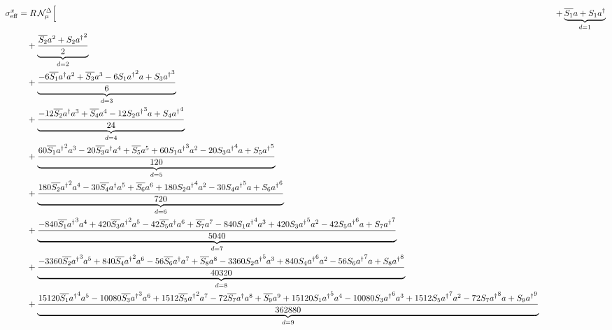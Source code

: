\begin{align}
\sigma^{x}_{\rm eff} &= R\,\mathcal N^{\Delta}_{\mu}\Bigl[
  &\quad + \underbrace{\overline{{S}_{1}} {a} + {S}_{1} {{a}^\dagger}}_{d=1} \\
  &\quad + \underbrace{\frac{\overline{{S}_{2}} {a}^{2} + {S}_{2} {{a}^\dagger}^{2}}{2}}_{d=2} \\
  &\quad + \underbrace{\frac{- 6 \overline{{S}_{1}} {{a}^\dagger} {a}^{2} + \overline{{S}_{3}} {a}^{3} - 6 {S}_{1} {{a}^\dagger}^{2} {a} + {S}_{3} {{a}^\dagger}^{3}}{6}}_{d=3} \\
  &\quad + \underbrace{\frac{- 12 \overline{{S}_{2}} {{a}^\dagger} {a}^{3} + \overline{{S}_{4}} {a}^{4} - 12 {S}_{2} {{a}^\dagger}^{3} {a} + {S}_{4} {{a}^\dagger}^{4}}{24}}_{d=4} \\
  &\quad + \underbrace{\frac{60 \overline{{S}_{1}} {{a}^\dagger}^{2} {a}^{3} - 20 \overline{{S}_{3}} {{a}^\dagger} {a}^{4} + \overline{{S}_{5}} {a}^{5} + 60 {S}_{1} {{a}^\dagger}^{3} {a}^{2} - 20 {S}_{3} {{a}^\dagger}^{4} {a} + {S}_{5} {{a}^\dagger}^{5}}{120}}_{d=5} \\
  &\quad + \underbrace{\frac{180 \overline{{S}_{2}} {{a}^\dagger}^{2} {a}^{4} - 30 \overline{{S}_{4}} {{a}^\dagger} {a}^{5} + \overline{{S}_{6}} {a}^{6} + 180 {S}_{2} {{a}^\dagger}^{4} {a}^{2} - 30 {S}_{4} {{a}^\dagger}^{5} {a} + {S}_{6} {{a}^\dagger}^{6}}{720}}_{d=6} \\
  &\quad + \underbrace{\frac{- 840 \overline{{S}_{1}} {{a}^\dagger}^{3} {a}^{4} + 420 \overline{{S}_{3}} {{a}^\dagger}^{2} {a}^{5} - 42 \overline{{S}_{5}} {{a}^\dagger} {a}^{6} + \overline{{S}_{7}} {a}^{7} - 840 {S}_{1} {{a}^\dagger}^{4} {a}^{3} + 420 {S}_{3} {{a}^\dagger}^{5} {a}^{2} - 42 {S}_{5} {{a}^\dagger}^{6} {a} + {S}_{7} {{a}^\dagger}^{7}}{5040}}_{d=7} \\
  &\quad + \underbrace{\frac{- 3360 \overline{{S}_{2}} {{a}^\dagger}^{3} {a}^{5} + 840 \overline{{S}_{4}} {{a}^\dagger}^{2} {a}^{6} - 56 \overline{{S}_{6}} {{a}^\dagger} {a}^{7} + \overline{{S}_{8}} {a}^{8} - 3360 {S}_{2} {{a}^\dagger}^{5} {a}^{3} + 840 {S}_{4} {{a}^\dagger}^{6} {a}^{2} - 56 {S}_{6} {{a}^\dagger}^{7} {a} + {S}_{8} {{a}^\dagger}^{8}}{40320}}_{d=8} \\
  &\quad + \underbrace{\frac{15120 \overline{{S}_{1}} {{a}^\dagger}^{4} {a}^{5} - 10080 \overline{{S}_{3}} {{a}^\dagger}^{3} {a}^{6} + 1512 \overline{{S}_{5}} {{a}^\dagger}^{2} {a}^{7} - 72 \overline{{S}_{7}} {{a}^\dagger} {a}^{8} + \overline{{S}_{9}} {a}^{9} + 15120 {S}_{1} {{a}^\dagger}^{5} {a}^{4} - 10080 {S}_{3} {{a}^\dagger}^{6} {a}^{3} + 1512 {S}_{5} {{a}^\dagger}^{7} {a}^{2} - 72 {S}_{7} {{a}^\dagger}^{8} {a} + {S}_{9} {{a}^\dagger}^{9}}{362880}}_{d=9} \\

\end{align}
